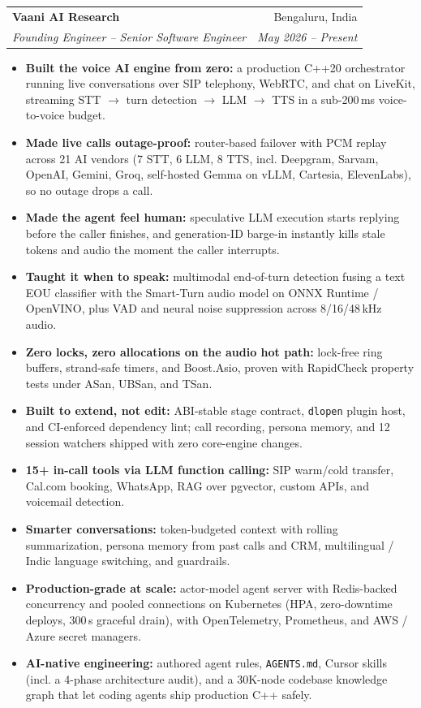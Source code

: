 \documentclass[letterpaper,10pt]{article}
\makeatletter
\newcommand{\resumeEntry}[4]{
  \vspace{2pt}
  \begin{tabularx}{\textwidth}{@{}X r@{}}
    \textbf{#1} & #2 \\
    \textit{#3} & \textit{#4} \\
  \end{tabularx}
  \vspace{-6pt}
}
\makeatother
\begin{document}
\resumeEntry{Vaani AI Research}{Bengaluru, India}
  {Founding Engineer -- Senior Software Engineer}{May 2026 -- Present}
\begin{itemize}
  \item \textbf{Built the voice AI engine from zero:} a production C++20 orchestrator running live
        conversations over SIP telephony, WebRTC, and chat on LiveKit, streaming STT $\rightarrow$
        turn detection $\rightarrow$ LLM $\rightarrow$ TTS in a sub-200\,ms voice-to-voice budget.
  \item \textbf{Made live calls outage-proof:} router-based failover with PCM replay across 21 AI vendors
        (7 STT, 6 LLM, 8 TTS, incl. Deepgram, Sarvam, OpenAI, Gemini, Groq, self-hosted Gemma on vLLM,
        Cartesia, ElevenLabs), so no outage drops a call.
  \item \textbf{Made the agent feel human:} speculative LLM execution starts replying before the caller
        finishes, and generation-ID barge-in instantly kills stale tokens and audio the moment the
        caller interrupts.
  \item \textbf{Taught it when to speak:} multimodal end-of-turn detection fusing a text EOU classifier
        with the Smart-Turn audio model on ONNX Runtime / OpenVINO, plus VAD and neural noise
        suppression across 8/16/48\,kHz audio.
  \item \textbf{Zero locks, zero allocations on the audio hot path:} lock-free ring buffers, strand-safe
        timers, and Boost.Asio, proven with RapidCheck property tests under ASan, UBSan, and TSan.
  \item \textbf{Built to extend, not edit:} ABI-stable stage contract, \texttt{dlopen} plugin host, and
        CI-enforced dependency lint; call recording, persona memory, and 12 session watchers shipped
        with zero core-engine changes.
  \item \textbf{15+ in-call tools via LLM function calling:} SIP warm/cold transfer, Cal.com booking,
        WhatsApp, RAG over pgvector, custom APIs, and voicemail detection.
  \item \textbf{Smarter conversations:} token-budgeted context with rolling summarization, persona memory
        from past calls and CRM, multilingual / Indic language switching, and guardrails.
  \item \textbf{Production-grade at scale:} actor-model agent server with Redis-backed concurrency and
        pooled connections on Kubernetes (HPA, zero-downtime deploys, 300\,s graceful drain), with
        OpenTelemetry, Prometheus, and AWS / Azure secret managers.
  \item \textbf{AI-native engineering:} authored agent rules, \texttt{AGENTS.md}, Cursor skills (incl. a
        4-phase architecture audit), and a 30K-node codebase knowledge graph that let coding agents
        ship production C++ safely.
\end{itemize}
\end{document}
